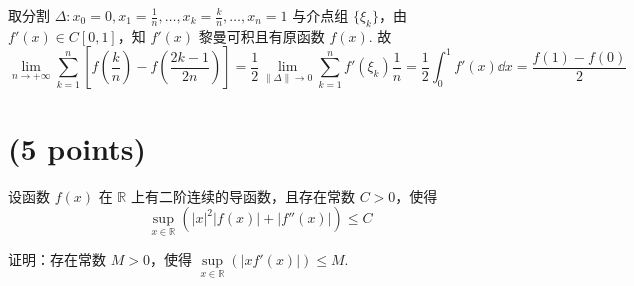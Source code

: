 \documentclass{ctexart}
\begin{document}
    取分割 $\Delta \colon x_0=0,x_1=\frac{1}{n},\ldots,x_k=\frac{k}{n},\ldots,x_n=1$ 与介点组 $\{\xi_k\}$，由 $f'(x) \in C[0,1]$，知 $f'(x)$ 黎曼可积且有原函数 $f(x)$. 故
    \[
        \lim_{n \to +\infty} \sum_{k=1}^n \left[ f\left(\frac{k}{n}\right) - f\left(\frac{2k-1}{2n}\right) \right]
        = \frac{1}{2} \lim_{\| \Delta \| \to 0} \sum_{k=1}^{n} f'\left(\xi_k\right) \frac{1}{n}
        = \frac{1}{2} \int_{0}^{1} f'(x) \dd{x}
        = \frac{f(1)-f(0)}{2}
    \]


\section{(5 points)}
    设函数 $f(x)$ 在 $\mathbb{R}$ 上有二阶连续的导函数，且存在常数 $C>0$，使得
    \[
        \sup_{x \in \mathbb{R}} \left( |x|^2 |f(x)| + |f''(x)| \right) \leqslant C
    \]

    证明：存在常数 $M>0$，使得 $\sup\limits_{x \in \mathbb{R}} \left(|xf'(x)|\right) \leqslant M$.
\end{document}

